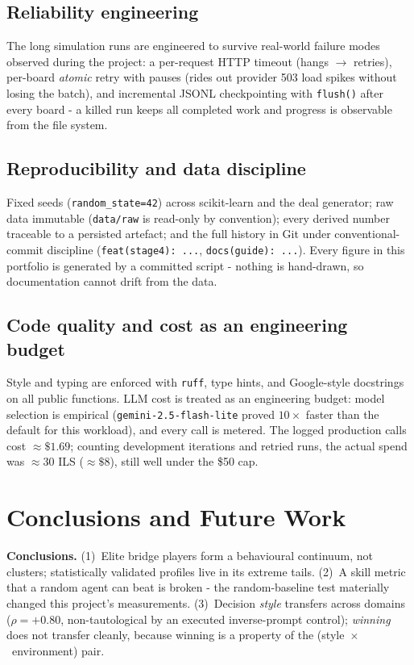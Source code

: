 \documentclass[11pt, a4paper, oneside, openany]{report}
\begin{document}
\section{Reliability engineering}
The long simulation runs are engineered to survive real-world failure modes
observed during the project: a per-request HTTP timeout (hangs
$\rightarrow$ retries), per-board \emph{atomic} retry with pauses (rides out
provider 503 load spikes without losing the batch), and incremental JSONL
checkpointing with \texttt{flush()} after every board - a killed run keeps
all completed work and progress is observable from the file system.

\section{Reproducibility and data discipline}
Fixed seeds (\texttt{random\_state=42}) across scikit-learn and the deal
generator; raw data immutable (\texttt{data/raw} is read-only by
convention); every derived number traceable to a persisted artefact; and the
full history in Git under conventional-commit discipline
(\texttt{feat(stage4): ...}, \texttt{docs(guide): ...}). Every figure in
this portfolio is generated by a committed script - nothing is hand-drawn,
so documentation cannot drift from the data.

\section{Code quality and cost as an engineering budget}
Style and typing are enforced with \texttt{ruff}, type hints, and
Google-style docstrings on all public functions. LLM cost is treated as an
engineering budget: model selection is empirical
(\texttt{gemini-2.5-flash-lite} proved $10\times$ faster than the default
for this workload), and every call is metered. The logged production calls
cost ${\approx}\$1.69$; counting development iterations and retried runs, the
actual spend was ${\approx}30$ ILS (${\approx}\$8$), still well under the
\$50 cap.

\chapter{Conclusions and Future Work}

\textbf{Conclusions.} (1)~Elite bridge players form a behavioural continuum,
not clusters; statistically validated profiles live in its extreme tails.
(2)~A skill metric that a random agent can beat is broken - the
random-baseline test materially changed this project's measurements.
(3)~Decision \emph{style} transfers across domains ($\rho = +0.80$,
non-tautological by an executed inverse-prompt control); \emph{winning} does
not transfer cleanly, because winning is a property of the
(style~$\times$~environment) pair.
\end{document}
